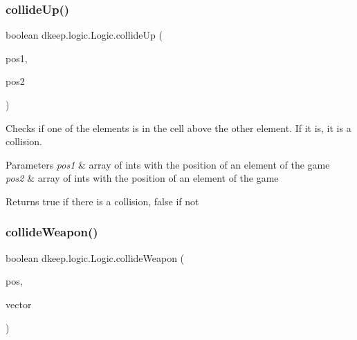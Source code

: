 \subsubsection{\texorpdfstring{collide\+Up()}{collideUp()}}
{\footnotesize\ttfamily boolean dkeep.\+logic.\+Logic.\+collide\+Up (\begin{DoxyParamCaption}\item[{int \mbox{[}$\,$\mbox{]}}]{pos1,  }\item[{int \mbox{[}$\,$\mbox{]}}]{pos2 }\end{DoxyParamCaption})}

Checks if one of the elements is in the cell above the other element. If it is, it is a collision. 
\begin{DoxyParams}{Parameters}
{\em pos1} & array of ints with the position of an element of the game \\
\hline
{\em pos2} & array of ints with the position of an element of the game \\
\hline
\end{DoxyParams}
\begin{DoxyReturn}{Returns}
true if there is a collision, false if not 
\end{DoxyReturn}
\mbox{\label{classdkeep_1_1logic_1_1_logic_a6205c4d1912a64443bd9e5743d2db3bb}} 
\subsubsection{\texorpdfstring{collide\+Weapon()}{collideWeapon()}}
{\footnotesize\ttfamily boolean dkeep.\+logic.\+Logic.\+collide\+Weapon (\begin{DoxyParamCaption}\item[{int \mbox{[}$\,$\mbox{]}}]{pos,  }\item[{Array\+List$<$ \hyperlink{classdkeep_1_1logic_1_1_weapon}{Weapon} $>$}]{vector }\end{DoxyParamCaption})}

